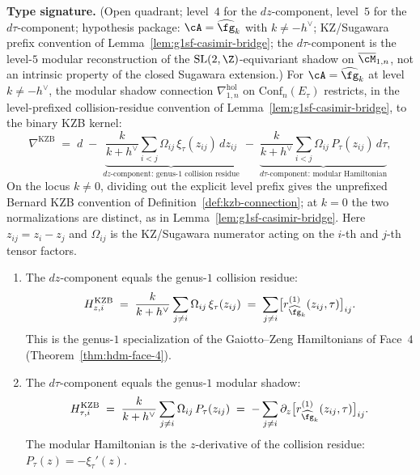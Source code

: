 \begin{theorem}
\label{thm:g1sf-face-4}
\textbf{Type signature.} (Open quadrant; level~$4$ for the
$dz$-component, level~$5$ for the $d\tau$-component; hypothesis
package: $\cA=\widehat{\fg}_k$ with $k\neq -h^\vee$; KZ/Sugawara
prefix convention of Lemma~\ref{lem:g1sf-casimir-bridge}; the
$d\tau$-component is the level-$5$ modular reconstruction of the
$\mathrm{SL}(2,\Z)$-equivariant shadow on $\overline{\cM}_{1,n}$, not
an intrinsic property of the closed Sugawara extension.)
For $\cA = \widehat{\fg}_k$ at level $k \neq -h^\vee$, the
modular shadow connection $\nabla^{\mathrm{hol}}_{1,n}$ on
$\mathrm{Conf}_n(E_\tau)$ restricts, in the level-prefixed
collision-residue convention of Lemma~\ref{lem:g1sf-casimir-bridge},
to the binary KZB kernel:
\begin{equation}\label{eq:g1sf-kzb-full}
\nabla^{\mathrm{KZB}}
\;=\;
d
\;-\;
\underbrace{
\frac{k}{k + h^\vee}
\sum_{i < j}
\Omega_{ij}\, \xi_\tau(z_{ij})\, dz_{ij}
}_{\text{$dz$-component: genus-$1$ collision residue}}
\;-\;
\underbrace{
\frac{k}{k + h^\vee}
\sum_{i < j}
\Omega_{ij}\, P_\tau(z_{ij})\, d\tau
}_{\text{$d\tau$-component: modular Hamiltonian}},
\end{equation}
On the locus $k\neq0$, dividing out the explicit level prefix gives
the unprefixed Bernard KZB convention of
Definition~\textup{\ref{def:kzb-connection}}; at $k=0$ the two
normalizations are distinct, as in Lemma~\ref{lem:g1sf-casimir-bridge}.
Here $z_{ij}=z_i-z_j$ and $\Omega_{ij}$ is the KZ/Sugawara numerator
acting on the $i$-th and $j$-th tensor factors.
\begin{enumerate}[label=\textup{(\roman*)}]
\item The $dz$-component equals the genus-$1$ collision residue:
\begin{equation}\label{eq:g1sf-kzb-z-component}
H_{z,i}^{\mathrm{KZB}}
\;=\;
\frac{k}{k + h^\vee}
\sum_{j \neq i}
\Omega_{ij}\, \xi_\tau(z_{ij})
\;=\;
\sum_{j \neq i}
\bigl[r_{\widehat{\fg}_k}^{(1)}(z_{ij}, \tau)\bigr]_{ij}.
\end{equation}
This is the genus-$1$ specialization of the Gaiotto--Zeng
Hamiltonians of Face~$4$ \textup{(}Theorem~\textup{\ref{thm:hdm-face-4})}.

\item The $d\tau$-component equals the genus-$1$ modular shadow:
\begin{equation}\label{eq:g1sf-kzb-tau-component}
H_{\tau,i}^{\mathrm{KZB}}
\;=\;
\frac{k}{k + h^\vee}
\sum_{j \neq i}
\Omega_{ij}\, P_\tau(z_{ij})
\;=\;
-\sum_{j \neq i}
\partial_z \bigl[r_{\widehat{\fg}_k}^{(1)}(z_{ij}, \tau)\bigr]_{ij}.
\end{equation}
The modular Hamiltonian is the $z$-derivative of the collision
residue: $P_\tau(z) = -\xi_\tau'(z)$.
\end{enumerate}
\end{theorem}

